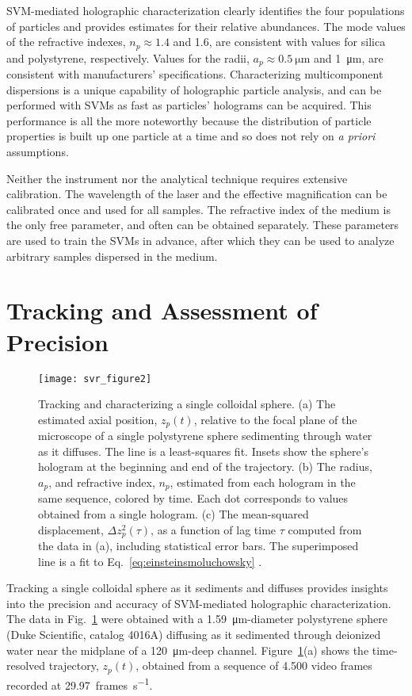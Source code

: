 SVM-mediated holographic characterization clearly identifies
the four populations of particles and provides estimates for their relative abundances.
The mode values of the refractive indexes, $n_p \approx \num{1.4}$ 
and \num{1.6}, are consistent with values for silica and polystyrene,
respectively.  Values for the radii, $a_p \approx \SI{0.5}{\um}$
and \SI{1}{\um}, are consistent with manufacturers'
specifications.
Characterizing multicomponent dispersions
is a unique capability of holographic particle analysis, and
can be performed with SVMs as fast as 
particles' holograms can be acquired.
This performance is all the more noteworthy because the
distribution of particle properties is built up one particle at a time
and so does not rely on \emph{a priori} assumptions.

Neither the instrument nor the analytical technique requires
extensive calibration.
The wavelength of the laser and the effective magnification can be
calibrated once and used for all samples.
The refractive index of the medium is the only free parameter, 
and often can be obtained separately.
These parameters are used to train the SVMs in advance,
after which they can be used to analyze arbitrary samples
dispersed in the medium.

\section{Tracking and Assessment of Precision}

\begin{figure}
  \centering
  \texttt{[image: svr\_figure2]}
  \caption{Tracking and characterizing a single colloidal sphere.
    (a) The estimated axial position, $z_p(t)$, relative to the focal plane
    of the microscope of a single polystyrene sphere sedimenting
    through water as it diffuses.  The line is a least-squares fit.
    Insets show the sphere's hologram at the beginning and end
    of the trajectory.
    (b) The radius, $a_p$, and refractive index, $n_p$,
    estimated from each hologram in the same sequence, colored
    by time.  Each dot corresponds to values obtained from a single
    hologram.
    (c) The mean-squared displacement, $\Delta z_p^2(\tau)$, as a function
    of lag time $\tau$ computed from the data in (a), including
    statistical error bars.  The superimposed line is a fit to
    Eq.~\eqref{eq:einsteinsmoluchowsky} \cite{yevick14}.}
  \label{fig:values}
\end{figure}

Tracking a single colloidal sphere as it sediments and diffuses
provides insights into
the precision and accuracy of SVM-mediated holographic characterization.
The data in Fig.~\ref{fig:values} were obtained with
a \SI{1.59}{\um}-diameter
polystyrene sphere (Duke Scientific, catalog 4016A)
diffusing as it sedimented through
deionized water near the midplane of
a \SI{120}{\um}-deep channel.
Figure~\ref{fig:values}(a) shows the time-resolved
trajectory, $z_p(t)$, obtained from a sequence of \num{4,500} video frames
recorded at \SI{29.97}{frames\per\second}.

